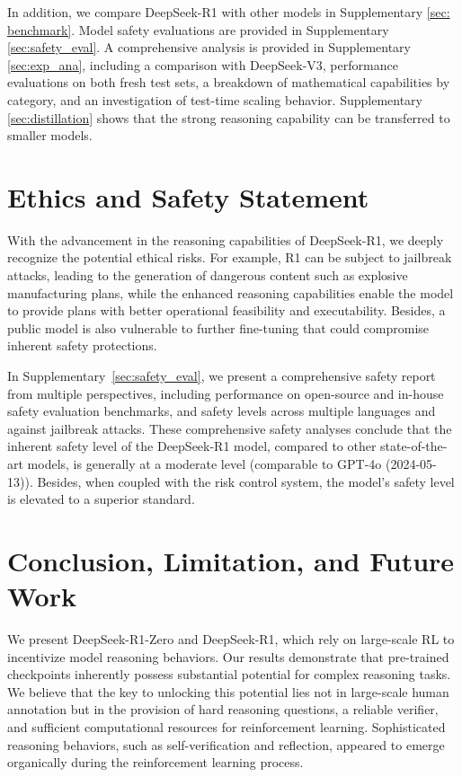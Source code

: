     In addition, we compare DeepSeek-R1 with other models in Supplementary \ref{sec: benchmark}. Model safety evaluations are provided in Supplementary \ref{sec:safety_eval}. 
    A comprehensive analysis is provided in Supplementary \ref{sec:exp_ana}, including a comparison with DeepSeek-V3, performance evaluations on both fresh test sets, a breakdown of mathematical capabilities by category, and an investigation of test-time scaling behavior. Supplementary \ref{sec:distillation} shows that the strong reasoning capability can be transferred to smaller models. 

\section{Ethics and Safety Statement} With the advancement in the reasoning capabilities of DeepSeek-R1, we deeply recognize the potential ethical risks. For example, R1 can be subject to jailbreak attacks, leading to the generation of dangerous content such as explosive manufacturing plans, while the enhanced reasoning capabilities enable the model to provide plans with better operational feasibility and executability. Besides, a public model is also vulnerable to further fine-tuning that could compromise inherent safety protections.

In Supplementary~\ref{sec:safety_eval}, we present a comprehensive safety report from multiple perspectives, including performance on open-source and in-house safety evaluation benchmarks, and safety levels across multiple languages and against jailbreak attacks. These comprehensive safety analyses conclude that the inherent safety level of the DeepSeek-R1 model, compared to other state-of-the-art models, is generally at a moderate level (comparable to GPT-4o (2024-05-13)). Besides, when coupled with the risk control system, the model's safety level is elevated to a superior standard.

\section{ Conclusion, Limitation, and Future Work} We present DeepSeek-R1-Zero and DeepSeek-R1, which rely on large-scale RL to incentivize model reasoning behaviors. Our results demonstrate that pre-trained checkpoints inherently possess substantial potential for complex reasoning tasks. We believe that the key to unlocking this potential lies not in large-scale human annotation but in the provision of hard reasoning questions, a reliable verifier, and sufficient computational resources for reinforcement learning. Sophisticated reasoning behaviors, such as self-verification and reflection, appeared to emerge organically during the reinforcement learning process.

